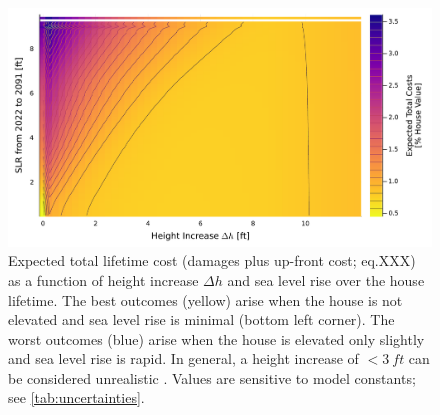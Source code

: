\documentclass[12pt]{article}
\begin{document}
\begin{figure}
    \centering
    \includegraphics[width=\textwidth]{scenario-map-height-slr}
    \caption{
        Expected total lifetime cost (damages plus up-front cost; eq.XXX) as a function of height increase $\Delta h$ and sea level rise over the house lifetime. %
        The best outcomes (yellow) arise when the house is not elevated and sea level rise is minimal (bottom left corner).
        The worst outcomes (blue) arise when the house is elevated only slightly and sea level rise is rapid.
        In general, a height increase of $<\SI{3}{ft}$ can be considered unrealistic \citep{zarekarizi_suboptimal:2020}.
        Values are sensitive to model constants; see \cref{tab:uncertainties}.
    }\label{fig:scenario-map-height-slr}
\end{figure}
\end{document}

